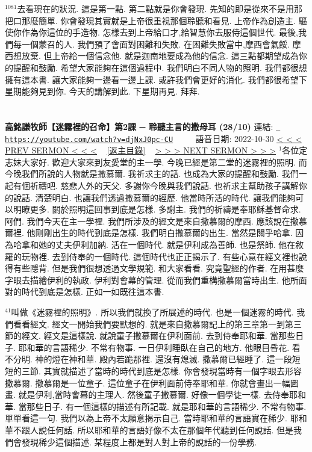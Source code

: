\documentclass{book}
\begin{document}
$^{1081}$去看現在的狀況.
這是第一點.
第二點就是你會發現.
先知的即是從來不是用那把口那麼簡單.
你會發現其實就是上帝很重視那個聆聽和看見.
上帝作為創造主.
驅使你作為你這位的手造物.
怎樣去到上帝給口才,給智慧你去服侍這個世代.
最後,我們每一個蒙召的人.
我們預了會面對困難和失敗.
在困難失敗當中,摩西會氣餒.
摩西想放棄.
但上帝給一個信念他.
就是迦南地要成為他的信念.
這三點都期望成為你的提醒和鼓勵.
希望大家能夠在這個過程中.
我們明白不同人物的照明.
我們都很想擁有這本書.
讓大家能夠一邊看一邊上課.
或許我們會更好的消化.
我們都很希望下星期能夠見到你.
今天的講解到此.
下星期再見.
拜拜.
\newpage



\section{}
\label{sec:djNxJ0pc_CU}
\textbf{高銘謙牧師【迷霧裡的召命】第2課 ─ 聆聽主言的撒母耳 (28/10)}
\newline
\newline
連結: \href{https://youtube.com/watch?v=djNxJ0pc-CU}{\texttt{ https://youtube.com/watch?v=djNxJ0pc-CU}} ~~~~ 語音日期: 2022-10-30 
\newline
\newline
\hyperref[sec:liEtjDNazis]{\small{< < < PREV SERMON < < <}}
~
\hyperref[sec:index]{\small{[返主目錄]}}
~
\hyperref[sec:H4gdcVXwfVM]{\small{> > > NEXT SERMON > > >}}
\newline
\newline
$^{1}$各位定志妹大家好.
歡迎大家來到友愛堂的主一學.
今晚已經是第二堂的迷霧裡的照明.
而今晚我們所說的人物就是撒慕爾.
我祈求主的話.
也成為大家的提醒和鼓勵.
我們一起有個祈禱吧.
慈悲人外的天父.
多謝你今晚與我們說話.
也祈求主幫助孩子講解你的說話.
清楚明白.
也讓我們透過撒慕爾的經歷.
他當時所活的時代.
讓我們能夠可以明瞭更多.
關於照明這回事到底是怎樣.
多謝主.
我們的祈禱是奉耶穌基督命求.
阿們.
我們今天在主一學裡.
我們所涉及的經文是來自撒慕爾的摩西.
應該說在撒慕爾裡.
他剛剛出生的時代到底是怎樣.
我們明白撒慕爾的出生.
當然是關乎哈拿.
因為哈拿和她的丈夫伊利加納.
活在一個時代.
就是伊利成為善師.
也是祭師.
他在敘羅的玩物裡.
去到侍奉的一個時代.
這個時代也正正揭示了.
有些心意在經文裡也說得有些隱背.
但是我們很想透過文學規範.
和大家看看.
究竟聖經的作者.
在用甚麼字眼去描繪伊利的執政.
伊利對會幕的管理.
從而我們重構撒慕爾當時出生.
他所面對的時代到底是怎樣.
正如一如既往這本書.

$^{41}$叫做《迷霧裡的照明》.
所以我們就換了所展述的時代.
也是一個迷霧的時代.
我們看看經文.
經文一開始我們要默想的.
就是來自撒慕爾記上的第三章第一到第三節的經文.
經文是這樣說.
就說童子撒慕爾在伊利面前.
去到侍奉耶和華.
當那些日子.
耶和華的言語稀少.
不常有物事.
一日伊利睡臥在自己的地方.
他眼目昏花.
看不分明.
神的燈在神和華.
殿內若跪那裡.
還沒有熄滅.
撒慕爾已經睡了.
這一段短短的三節.
其實就描述了當時的時代到底是怎樣.
你會發現當時有一個字眼去形容撒慕爾.
撒慕爾是一位童子.
這位童子在伊利面前侍奉耶和華.
你就會畫出一幅圖畫.
就是伊利,當時會幕的主理人.
然後童子撒慕爾.
好像一個學徒一樣.
去侍奉耶和華.
當那些日子.
有一個這樣的描述有所記載.
就是耶和華的言語稀少.
不常有物事.
單單看這一句.
我們以為上帝不太願意揭示自己.
當時耶和華的言語實在稀少.
耶和華不跟人說任何話.
所以耶和華的言語好像不太在那個年代聽到任何說話.
但是我們會發現稀少這個描述.
某程度上都是對人對上帝的說話的一份學務.
\end{document}
